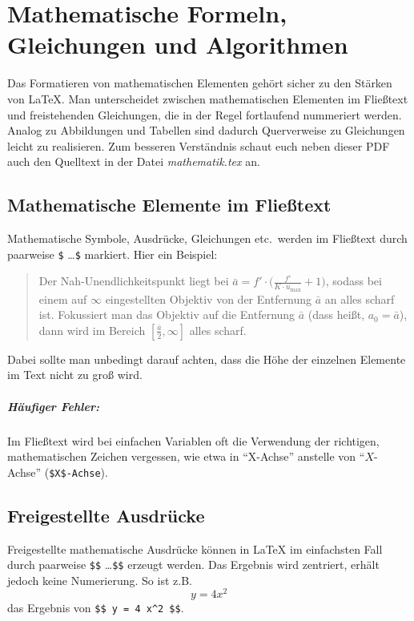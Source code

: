 \chapter[Mathem.\ Formeln etc.]{Mathematische Formeln, Gleichungen und Algorithmen}
\label{chap:Mathematik}


Das Formatieren von mathematischen Elementen gehört sicher zu den
Stärken von \LaTeX{}. Man unterscheidet zwischen mathematischen Elementen
im Fließtext und freistehenden Gleichungen, die in der Regel
fortlaufend nummeriert werden. Analog zu Abbildungen und Tabellen sind dadurch
Querverweise zu Gleichungen leicht zu realisieren. Zum besseren Verständnis schaut euch neben dieser PDF auch den Quelltext in der Datei \emph{mathematik.tex} an.


\section{Mathematische Elemente im Fließtext}

Mathematische Symbole, Ausdrücke, Gleichungen etc.\ werden im Fließtext durch paarweise \verb!$! \ldots \verb!$! markiert. Hier ein Beispiel:
%
\begin{quote}
Der Nah-Unendlichkeitspunkt liegt bei
$\bar{a} = f' \cdot \bigl( \frac{f'}{K \cdot u_{\max}} + 1 \bigr)$,
sodass bei einem auf $\infty$ eingestellten Objektiv von der Entfernung
$\bar{a}$ an alles scharf ist. Fokussiert man das
Objektiv auf die Entfernung $\bar{a}$ (dass heißt, $a_0 = \bar{a}$), dann wird
im Bereich $[\frac{\bar{a}}{2}, \infty]$ alles scharf.
\end{quote}
%
Dabei sollte man unbedingt darauf achten, dass die Höhe der einzelnen Elemente im Text nicht zu groß wird. 

\paragraph{Häufiger Fehler:} 
Im Fließtext wird bei einfachen Variablen oft die Verwendung der richtigen, mathematischen Zeichen vergessen, wie etwa in 
"`X-Achse"' anstelle von "`$X$-Achse"' (\verb!$X$-Achse!).



\section{Freigestellte Ausdrücke}

Freigestellte mathematische Ausdrücke können in \LaTeX{} im einfachsten Fall durch paarweise \verb!$$! \ldots \verb!$$! erzeugt werden. Das Ergebnis wird zentriert, erhält jedoch keine Numerierung. So ist z.B.\ $$ y = 4 x^2 $$ das Ergebnis von \verb!$$ y = 4 x^2 $$!.

